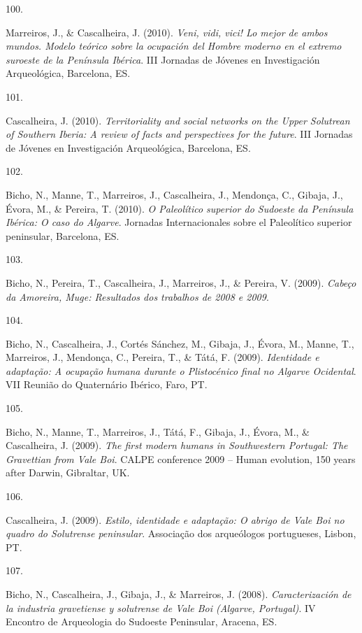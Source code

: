 \documentclass[11pt,a4paper,]{awesome-cv}
\newlength{\cslhangindent}
\newlength{\csllabelwidth}
\newenvironment{CSLReferences}[2] %
 {\begin{list}{}{%
  \setlength{\itemindent}{0pt}
  \setlength{\leftmargin}{0pt}
  \setlength{\parsep}{0pt}
  \ifodd #1
   \setlength{\leftmargin}{\cslhangindent}
   \setlength{\itemindent}{-1\cslhangindent}
  \fi
  \setlength{\itemsep}{#2\baselineskip}}}
 {\end{list}}
\newcommand{\CSLLeftMargin}[1]{\parbox[t]{\csllabelwidth}{\strut#1\strut}}
\newcommand{\CSLRightInline}[1]{\parbox[t]{\linewidth - \csllabelwidth}{\strut#1\strut}}
\begin{document}
\begin{CSLReferences}{0}{0}
\CSLLeftMargin{100. }%
\CSLRightInline{Marreiros, J., \& Cascalheira, J. (2010). \emph{Veni,
vidi, vici! Lo mejor de ambos mundos. Modelo teórico sobre la ocupación
del Hombre moderno en el extremo suroeste de la Península Ibérica}. III
Jornadas de Jóvenes en Investigación Arqueológica, Barcelona, ES.}

\CSLLeftMargin{101. }%
\CSLRightInline{Cascalheira, J. (2010). \emph{Territoriality and social
networks on the Upper Solutrean of Southern Iberia: A review of facts
and perspectives for the future}. III Jornadas de Jóvenes en
Investigación Arqueológica, Barcelona, ES.}

\CSLLeftMargin{102. }%
\CSLRightInline{Bicho, N., Manne, T., Marreiros, J., Cascalheira, J.,
Mendonça, C., Gibaja, J., Évora, M., \& Pereira, T. (2010). \emph{O
Paleolítico superior do Sudoeste da Península Ibérica: O caso do
Algarve}. Jornadas Internacionales sobre el Paleolítico superior
peninsular, Barcelona, ES.}

\CSLLeftMargin{103. }%
\CSLRightInline{Bicho, N., Pereira, T., Cascalheira, J., Marreiros, J.,
\& Pereira, V. (2009). \emph{Cabeço da Amoreira, Muge: Resultados dos
trabalhos de 2008 e 2009}.}

\CSLLeftMargin{104. }%
\CSLRightInline{Bicho, N., Cascalheira, J., Cortés Sánchez, M., Gibaja,
J., Évora, M., Manne, T., Marreiros, J., Mendonça, C., Pereira, T., \&
Tátá, F. (2009). \emph{Identidade e adaptação: A ocupação humana durante
o Plistocénico final no Algarve Ocidental}. VII Reunião do Quaternário
Ibérico, Faro, PT.}

\CSLLeftMargin{105. }%
\CSLRightInline{Bicho, N., Manne, T., Marreiros, J., Tátá, F., Gibaja,
J., Évora, M., \& Cascalheira, J. (2009). \emph{The first modern humans
in Southwestern Portugal: The Gravettian from Vale Boi}. CALPE
conference 2009 -- Human evolution, 150 years after Darwin, Gibraltar,
UK.}

\CSLLeftMargin{106. }%
\CSLRightInline{Cascalheira, J. (2009). \emph{Estilo, identidade e
adaptação: O abrigo de Vale Boi no quadro do Solutrense peninsular}.
Associação dos arqueólogos portugueses, Lisbon, PT.}

\CSLLeftMargin{107. }%
\CSLRightInline{Bicho, N., Cascalheira, J., Gibaja, J., \& Marreiros, J.
(2008). \emph{Caracterización de la industria gravetiense y solutrense
de Vale Boi (Algarve, Portugal)}. IV Encontro de Arqueologia do Sudoeste
Peninsular, Aracena, ES.}


\end{CSLReferences}
\end{document}
